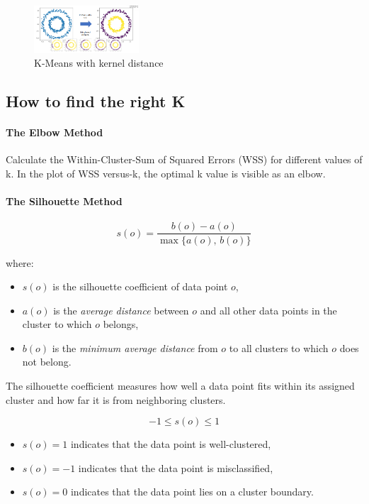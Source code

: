 \documentclass[11pt]{article}
\begin{document}
\begin{figure}[h]
	\centering
	\includegraphics[width=0.35\textwidth]{../imgs/kmeans-ker.png}
	\caption{K-Means with kernel distance}
\end{figure}



\subsection*{How to find the right K}

\paragraph*{The Elbow Method}
Calculate the Within-Cluster-Sum of Squared Errors (WSS) for different values of k. In the plot of WSS versus-k, the optimal k value is visible as an elbow.

\paragraph*{The Silhouette Method}

\[
	s(o) = \frac{b(o) - a(o)}{\max\{a(o),\, b(o)\}}
\]

\noindent where:
\begin{itemize}
	\item $s(o)$ is the silhouette coefficient of data point $o$,
	\item $a(o)$ is the \textit{average distance} between $o$ and all other data points in the cluster to which $o$ belongs,
	\item $b(o)$ is the \textit{minimum average distance} from $o$ to all clusters to which $o$ does not belong.
\end{itemize}

The silhouette coefficient measures how well a data point fits within its assigned cluster and how far it is from neighboring clusters.

\[
	-1 \leq s(o) \leq 1
\]
\begin{itemize}
	\item $s(o) = 1$ indicates that the data point is well-clustered,
	\item $s(o) = -1$ indicates that the data point is misclassified,
	\item $s(o) = 0$ indicates that the data point lies on a cluster boundary.
\end{itemize}
\end{document}
